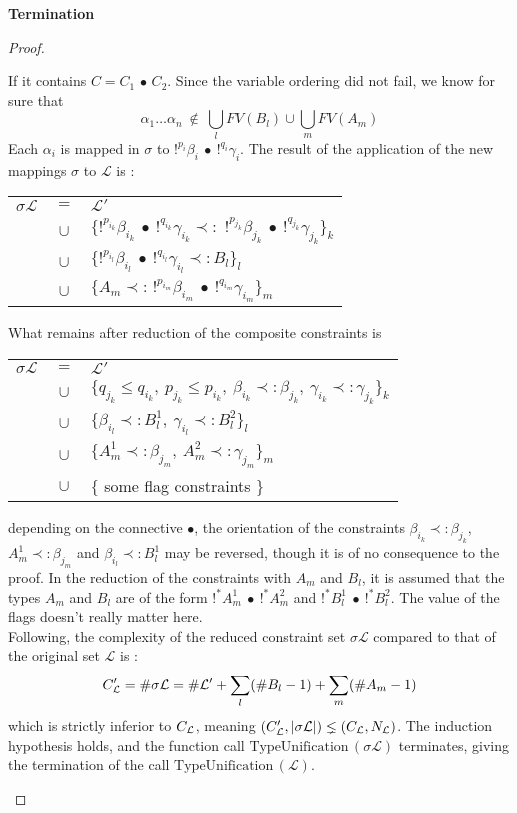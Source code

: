 \begin{thm}{\bf Termination}
\begin{proof}
\begin{itemize}
				If it contains $C = C_1 \,\bullet\, C_2$. Since the variable ordering did not fail, we know for sure that
						$$\alpha_1 \dots \alpha_n ~ \notin ~ \bigcup_{l} FV(B_l) \cup \bigcup_{m} FV(A_m)$$
				Each $\alpha_i$ is mapped in $\sigma$ to $!^{p_i} \beta_i ~ \bullet ~ !^{q_i}\gamma_i$.
				The result of the application of the new mappings $\sigma$ to $\mathcal{L}$ is :
			  	\begin{center}
			  	\begin{tabular}{lcl}
			  		$\sigma \mathcal{L}$ & $ = $ & $\mathcal{L'}$ \\
				  	& $ \cup $ & $\{!^{p_{i_k}} \beta_{i_k} ~ \bullet ~ !^{q_{i_k}}\gamma_{i_k} \prec: \,
				  	              \,!^{p_{j_k}} \beta_{j_k} ~ \bullet ~ !^{q_{j_k}}\gamma_{j_k} \}_k$ \\
				  	& $ \cup $ & $\{!^{p_{i_l}} \beta_{i_l} ~ \bullet ~ !^{q_{i_l}}\gamma_{i_l} \prec: B_l \}_l$ \\
				  	& $ \cup $ & $\{ A_m \prec: \,!^{p_{i_m}} \beta_{i_m} ~ \bullet ~ !^{q_{i_m}}\gamma_{i_m} \}_m$
				  \end{tabular}
				  \end{center}
       	What remains after reduction of the composite constraints is
					\begin{center}
			  	\begin{tabular}{lcl}
			  		$\sigma \mathcal{L}$ & $ = $ & $\mathcal{L'}$ \\
			  		& $ \cup $ & $\{q_{j_k} \le q_{i_k}, ~p_{j_k} \le p_{i_k}, ~\beta_{i_k} \prec: \beta_{j_k}, ~\gamma_{i_k} \prec: \gamma_{j_k} \}_k$ \\
			  		& $ \cup $ & $\{ \beta_{i_l} \prec: B^1_l, ~ \gamma_{i_l} \prec: B^2_l \}_l$ \\
			  		& $ \cup $ & $\{ A^1_m \prec: \beta_{j_m}, ~ A^2_m \prec: \gamma_{j_m} \}_m$ \\
			  		& $ \cup $ & $\{$ some flag constraints $\}$
			  	\end{tabular}
			  	\end{center}
				depending on the connective $\bullet$, the orientation of the constraints $\beta_{i_k} \prec: \beta_{j_k}$,
				$A^1_m \prec: \beta_{j_m}$ and $\beta_{i_l} \prec: B^1_l$ may be reversed, though it is of no consequence to the proof.
			  In the reduction of the constraints with $A_m$ and $B_l$, it is assumed that the types $A_m$ and $B_l$ are of the form
			  $!^*A^1_m ~\bullet~ !^*A^2_m$ and $!^*B^1_l ~\bullet~ !^*B^2_l$. The value of the flags doesn't really matter here. \\
			  Following, the complexity of the reduced constraint set $\sigma \mathcal{L}$ compared to that of the original set $\mathcal{L}$ is :
			  	$$C_{\mathcal{L}}' = \#\sigma\mathcal{L} = \#\mathcal{L'} + \sum_{l} (\#B_l - 1) + \sum_{m} (\#A_m - 1) $$
			  which is strictly inferior to $C_{\mathcal{L}}$, meaning $(C_{\mathcal{L}}',|\sigma\mathcal{L}|) \lneq (C_{\mathcal{L}}, N_{\mathcal{L}})$.
			  The induction hypothesis holds, and the function call $\text{TypeUnification}\,(\sigma \mathcal{L})$ terminates,
			  giving the termination of the call $\text{TypeUnification}\,(\mathcal{L})$.
			  

\end{itemize}
\end{proof}
\end{thm}
